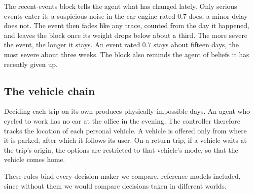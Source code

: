 The recent-events block tells the agent what has changed lately. Only serious events enter
it: a suspicious noise in the car engine rated 0.7 does, a minor delay does not. The event then fades like any
trace, counted from the day it happened, and leaves the block once its weight drops below
about a third. The more severe the event, the longer it stays. An event rated 0.7 stays about
fifteen days, the most severe about three weeks. The block also reminds the agent of beliefs
it has recently given up.

\subsection{The vehicle chain}
\label{sec:chain}

Deciding each trip on its own produces physically impossible days. An agent who cycled to
work has no car at the office in the evening. The controller therefore tracks the location of
each personal vehicle. A vehicle is offered only from where it is parked, after which it
follows its user. On a return trip, if a vehicle waits at the trip's origin, the options are
restricted to that vehicle's mode, so that the vehicle comes home.

These rules bind every decision-maker we compare, reference models included, since without
them we would compare decisions taken in different worlds.